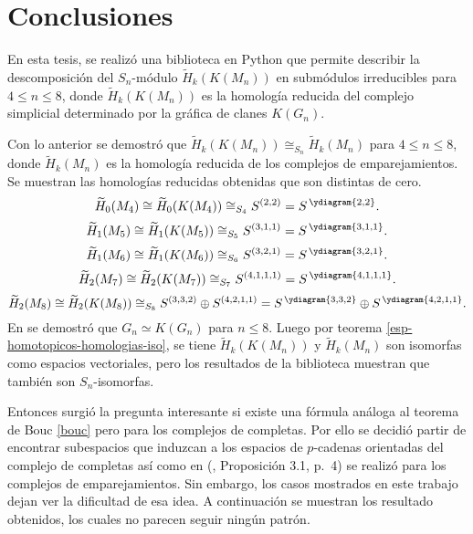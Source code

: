 \documentclass[12pt]{book}
\theoremstyle{definition}
\newcounter{in}
\begin{document}
\chapter{Conclusiones}
\label{summary}
En esta tesis, se realizó una biblioteca en Python que permite describir
la descomposición del $S_{n}$-módulo $\widetilde H_{k}(K(M_{n}))$ en
submódulos irreducibles para $4 \leq n \leq 8$, donde $\widetilde
H_{k}(K(M_{n}))$ es la homología reducida del complejo
simplicial determinado por la gráfica de clanes $K(G_{n})$.

Con lo anterior se demostró que
$\widetilde H_{k}(K(M_{n})) \cong_{S_{n}} \widetilde H_{k}(M_{n})$
para $4 \leq n \leq 8$, donde $\widetilde H_{k}(M_{n})$ es la
homología reducida de los complejos de emparejamientos. Se muestran
las homologías reducidas obtenidas que son distintas de cero.
\begin{equation*}
  \widetilde H_{0}(M_{4})\cong\widetilde H_{0}(K(M_{4}))\cong_{S_{4}} S^{(2,2)}=S^{\,\ydiagram{2,2}}.
\end{equation*}
\begin{equation*}
  \widetilde H_{1}(M_{5})\cong\widetilde H_{1}(K(M_{5}))\cong_{S_{5}} S^{(3,1,1)}=S^{\,\ydiagram{3,1,1}}.
\end{equation*}
\begin{equation*}
  \widetilde H_{1}(M_{6})\cong\widetilde H_{1}(K(M_{6}))\cong_{S_{6}} S^{(3,2,1)}=S^{\,\ydiagram{3,2,1}}.
\end{equation*}
\begin{equation*}
  \widetilde H_{2}(M_{7})\cong\widetilde H_{2}(K(M_{7}))\cong_{S_{7}} S^{(4,1,1,1)}=S^{\,\ydiagram{4,1,1,1}}.
\end{equation*}
\begin{equation*}
  \widetilde H_{2}(M_{8})\cong\widetilde H_{2}(K(M_{8}))\cong_{S_{8}} S^{(3,3,2)} \oplus S^{(4,2,1,1)} = S^{\,\ydiagram{3,3,2}} \oplus S^{\,\ydiagram{4,2,1,1}}.
\end{equation*}
En \cite{larrion2008equivariant} se demostró que $G_{n} \simeq
K(G_{n})$ para $n \leq 8$. Luego por teorema
\ref{esp-homotopicos-homologias-iso}, se tiene $\widetilde
H_{k}(K(M_{n}))$ y $\widetilde H_{k}(M_{n})$ son isomorfas como
espacios vectoriales, pero los resultados de la biblioteca muestran que
también son $S_{n}$-isomorfas.

Entonces surgió la pregunta interesante si existe una fórmula análoga
al teorema de Bouc \ref{bouc} pero para los complejos de completas. 
Por ello se decidió partir de encontrar subespacios que induzcan a los espacios de $p$-cadenas orientadas
del complejo de completas así como en
\normalfont(\cite{dong2002combinatorial}, Proposición 3.1, p.~4) se
realizó para los complejos de emparejamientos. Sin embargo, los casos
mostrados en este trabajo dejan ver la dificultad de esa idea. A
continuación se muestran los resultado obtenidos, los cuales no parecen
seguir ningún patrón.
\end{document}
